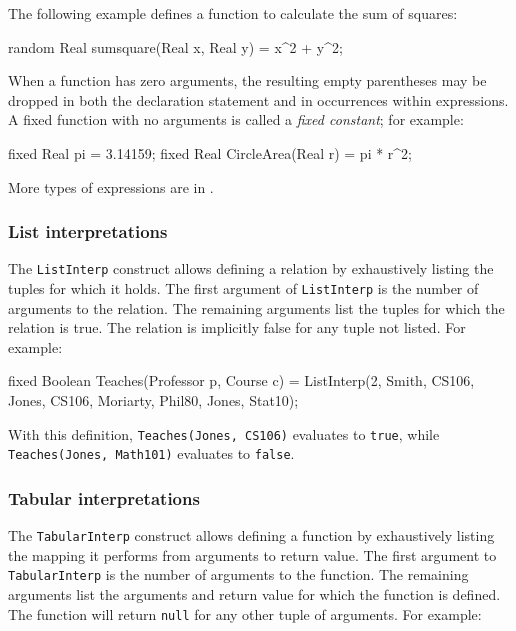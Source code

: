 The following example defines a function to calculate the sum of squares:
\begin{blogcode}
random Real sumsquare(Real x, Real y) = x^2 + y^2;
\end{blogcode}

When a function has zero arguments, the resulting empty parentheses may be dropped
in both the declaration statement and in occurrences within expressions.
A fixed function with no arguments is called a \emph{fixed constant}; for
example:
\begin{blogcode}
fixed Real pi = 3.14159;
fixed Real CircleArea(Real r) = pi * r^2;
\end{blogcode}

More types of expressions are in .

\subsubsection{List interpretations}\label{sec:list-interp}

The \verb|ListInterp| construct allows defining a relation by exhaustively
listing the tuples for which it holds. The first argument of \verb|ListInterp|
is the number of arguments to the relation. The remaining arguments list the
tuples for which the relation is true. The relation is implicitly false for any
tuple not listed. For example:

\begin{blogcode}
fixed Boolean Teaches(Professor p, Course c)
    = ListInterp(2, Smith, CS106,
                    Jones, CS106,
                    Moriarty, Phil80,
                    Jones, Stat10);
\end{blogcode}

With this definition, {\tt Teaches(Jones, CS106)} evaluates to \verb|true|,
while {\tt Teaches(Jones, Math101)} evaluates to \verb|false|.


\subsubsection{Tabular interpretations}\label{sec:tabular-interp}

The \verb|TabularInterp| construct allows defining a function by exhaustively
listing the mapping it performs from arguments to return value. The first
argument to \verb|TabularInterp| is the number of arguments to the function.
The remaining arguments list the arguments and return value for which the
function is defined. The function will return \verb|null| for any other tuple
of arguments. For example:

